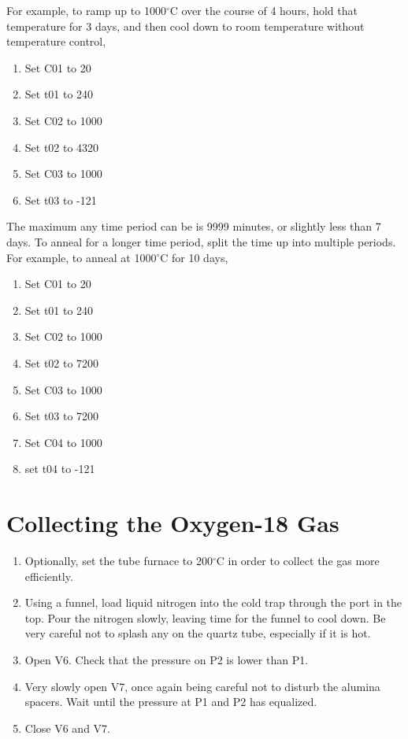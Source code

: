\documentclass{thesis-umich}
\begin{document}
For example, to ramp up to 1000$^\circ$C over the course of 4 hours, hold that temperature for 3 days, and then cool down to room temperature without temperature control, 
\begin{enumerate}
	\item Set C01 to 20
	\item Set t01 to 240
	\item Set C02 to 1000
	\item Set t02 to 4320
	\item Set C03 to 1000
	\item Set t03 to -121
\end{enumerate}

The maximum any time period can be is 9999 minutes, or slightly less than 7 days. To anneal for a longer time period, split the time up into multiple periods. For example, to anneal at 1000$^\circ$C for 10 days,
\begin{enumerate}
	\item Set C01 to 20
	\item Set t01 to 240
	\item Set C02 to 1000
	\item Set t02 to 7200
	\item Set C03 to 1000
	\item Set t03 to 7200
	\item Set C04 to 1000
	\item set t04 to -121
\end{enumerate}

\section{Collecting the Oxygen-18 Gas}
\label{anneal:collect}
\begin{enumerate}
	\item Optionally, set the tube furnace to 200$^\circ$C in order to collect the gas more efficiently.
	\item Using a funnel, load liquid nitrogen into the cold trap through the port in the top. Pour the nitrogen slowly, leaving time for the funnel to cool down. Be very careful not to splash any on the quartz tube, especially if it is hot.
	\item Open V6. Check that the pressure on P2 is lower than P1.
	\item Very slowly open V7, once again being careful not to disturb the alumina spacers. Wait until the pressure at P1 and P2 has equalized.
	\item Close V6 and V7.
\end{enumerate}




\end{document}
